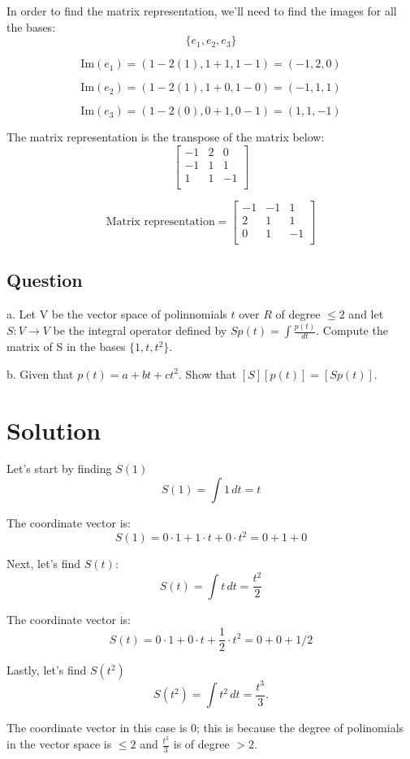 \documentclass{book}
\begin{document}
In order to find the matrix representation, we'll need to find the images for all the bases:
\[\{e_1, e_2, e_3\}\]

\[\text{Im}(e_1) = (1 - 2(1), 1 + 1, 1 - 1) = (-1, 2, 0)\]

\[\text{Im}(e_2) = (1 - 2(1), 1 + 0, 1 - 0) = (-1, 1, 1)\]

\[\text{Im}(e_3) = (1 - 2(0), 0 + 1, 0 - 1) = (1, 1, -1)\]

The matrix representation is the transpose of the matrix below:
\[\begin{bmatrix}
	-1 & 2 & 0 \\
	-1 & 1 & 1 \\
	1 & 1 & -1 \\
\end{bmatrix}\]

\[\text{Matrix representation} = \begin{bmatrix}
	-1 & -1 & 1 \\
	2 & 1 & 1 \\
	0 & 1 & -1 \\
\end{bmatrix}\]

\subsection{Question}
a. Let V be the vector space of polinnomials \(t\) over \(R\) of degree \(\leq 2\) and let \(S: V \to V\) be the integral operator defined by \(Sp(t) = \int \frac{p(t)}{dt}\). Compute the matrix of S in the bases \(\{1, t, t^2\}\).

b. Given that \(p(t) = a + bt + ct^2\). Show that \([S][p(t)] = [Sp(t)]\).

\section*{Solution}
Let's start by finding \(S(1)\)
\[
	S(1) = \int 1 \, dt = t
\]

The coordinate vector is:
\[
	S(1) = 0 \cdot 1 + 1 \cdot t + 0 \cdot t^2 = 0 + 1 + 0
\]

Next, let's find \(S(t)\):
\[
	S(t) = \int t \, dt = \frac{t^2}{2}
\]

The coordinate vector is:
\[
	S(t) = 0 \cdot 1 + 0 \cdot t + \frac{1}{2} \cdot t^2  = 0 + 0 + 1/2
\]

Lastly, let's find \(S(t^2)\)
\[
	S(t^2) = \int t^2 \, dt = \frac{t^3}{3}.
\]

The coordinate vector in this case is 0; this is because the degree of polinomials in the vector space is \(\leq 2\) and \(\frac{t^3}{3}\) is of degree \(> 2\).
\end{document}
